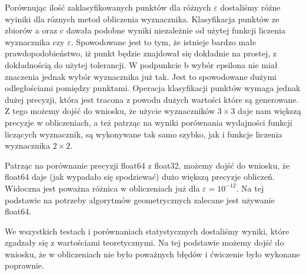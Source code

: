 \quad Porównując ilość zaklasyfikowanych punktów dla różnych $\varepsilon$ dostaliśmy róźne wyiniki 
dla róznych metod obliczenia wyznacznika. 
Klasyfikacja punktów ze zbiorów a oraz c dawała podobne wyniki niezależnie od użytej
funkcji liczenia wyznacznika czy $\varepsilon$. Spowodowane jest to tym, że
istnieje bardzo małe prawdopodobieństwo, iż punkt będzie znajdował się
dokładnie na prostej, z dokładnością do użytej tolerancji. W podpunkcie
b wybór epsilona nie miał znaczenia jednak wybór wyznacznika już tak.
Jest to spowodowane dużymi odległościami pomiędzy punktami. Operacja klasyfikacji punktów wymaga jednak
dużej precyzji, która jest tracona z powodu dużych wartości które są
generowane. Z tego możemy dojść do wniosku, że użycie wyznaczników $3 \times 3$ daje 
nam większą precyzje w obliczeniach, a też patrząc na wyniki porównania wydajności funkcji 
liczących wyznacznik, są wykonywane tak samo szybko, jak i funkcje liczenia wyznacznika $2 \times 2$.
\par
\quad Patrząc na porównanie precyzji float64 z float32, możemy dojść do wniosku, 
że float64 daje (jak wypadało się spodziewać) dużo większą precyzje obliczeń. 
Widoczna jest poważna różnica w obliczeniach już dla $\varepsilon = 10^{-12}$. 
Na tej podstawie na potrzeby algorytmów geometrycznych zalecane jest 
używanie float64.
\par
\quad We wszystkich testach i porównaniach statystycznych dostaliśmy 
wyniki, które zgadzały się z wartościami teoretycznymi. Na tej 
podstawie możemy dojść do wniosku, że w obliczeniach nie było poważnych 
błędów i ćwiczenie było wykonane poprawnie.

